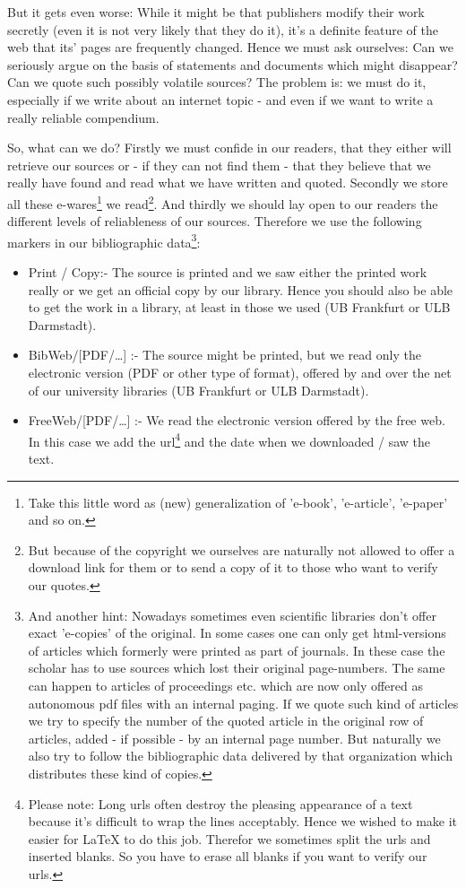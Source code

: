 But it gets even worse: While it might be that publishers modify their work
secretly (even it is not very likely that they do it), it's a definite feature
of the web that its' pages are fre\-quen\-tly changed. Hence we must ask
ourselves: Can we seriously argue on the basis of statements and documents which
might disappear? Can we quote such possibly volatile sources? The problem is: we
must do it, especially if we write about an internet topic - and even if we want
to write a really reliable compendium.

So, what can we do? Firstly we must confide in our readers, that they either
will retrieve our sources or - if they can not find them - that they
believe that we really have found and read what we have written and
quoted. Secondly we store all these e-wares\footnote{Take this little word as
(new) generalization of 'e-book', 'e-article', 'e-paper' and so on.} we
read\footnote{But because of the copyright we ourselves are naturally not
allowed to offer a download link for them or to send a copy of it to those who
want to verify our quotes.}. And thirdly we should lay open to our readers the
different levels of reliableness of our sources. Therefore we use
the following markers in our bibliographic data\footnote{And another hint: Nowadays sometimes
even scientific libraries don't offer exact 'e-copies' of the original. In
some cases one can only get html-versions of articles which formerly were
printed as part of journals. In these case the scholar has to use sources which
lost their original page-numbers. The same can happen to articles of proceedings
etc. which are now only offered as autonomous pdf files with an internal paging.
If we quote such kind of articles we try to specify the number of the quoted
article in the original row of articles, added - if possible - by an internal
page number. But naturally we also try to follow the bibliographic data
delivered by that organization which distributes these kind of copies.}:

\begin{itemize}
  \item Print / Copy:- The source is printed and we saw either the printed work
  really or we get an official copy by our library. Hence you should also be able
  to get the work in a library, at least in those we used (UB Frankfurt or ULB
  Darmstadt).
  \item BibWeb/[PDF/\ldots] :- The source might be printed, but we read only the
  electronic version (PDF or other type of format), offered by and over the
  net of our university libraries (UB Frankfurt or ULB Darmstadt).
  \item FreeWeb/[PDF/\ldots] :- We read the electronic version offered by the
  free web. In this case we add the url\footnote{Please note: Long urls often
  destroy the pleasing appearance of a text because it's difficult to wrap the
  lines acceptably. Hence we wished to make it easier for LaTeX to do this job.
  Therefor we sometimes split the urls and inserted blanks. So you have to erase
  all blanks if you want to verify our urls.} and the date when we downloaded /
  saw the text.
\end{itemize}


%
